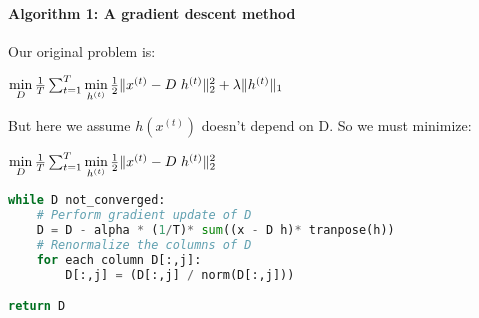 \documentclass[a4paper,10pt]{article}
\begin{document}
\paragraph{Algorithm 1: A gradient descent method}
Our original problem is:
\begin{center}
 $\min\limits_{D} \frac{1}{T} \sum_{t=1}^{T}  \min\limits_{h^{(t)}} \frac{1}{2} \| x^{(t)} - D \hspace{3px} h^{(t)} \|_2^2 + \lambda \|h^{(t)} \|_1$\\
\end{center}
But here we assume $h(x^{(t)})$ doesn't depend on D. So we must minimize:
\begin{center}
 $\min\limits_{D} \frac{1}{T} \sum_{t=1}^{T}  \min\limits_{h^{(t)}} \frac{1}{2} \| x^{(t)} - D \hspace{3px} h^{(t)} \|_2^2 $\\
\end{center}
\begin{lstlisting}[language=Python,frame=single]
while D not_converged:
    # Perform gradient update of D
    D = D - alpha * (1/T)* sum((x - D h)* tranpose(h))
    # Renormalize the columns of D
    for each column D[:,j]:
        D[:,j] = (D[:,j] / norm(D[:,j]))

return D
\end{lstlisting}
\end{document}
